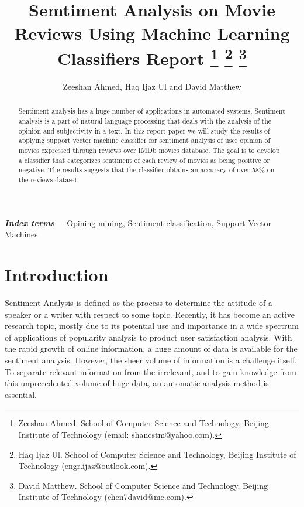 \documentclass[conference]{IEEEtran}
\providecommand{\keywords}[1]{\textbf{\textit{Index terms---}} #1}
\begin{document}
\title{\ \\ \LARGE\bf Semtiment Analysis on Movie Reviews Using Machine Learning Classifiers Report \thanks{Zeeshan Ahmed. 
School of Computer Science and Technology, Beijing Institute of Technology
(email: shancstm@yahoo.com).}
\thanks{Haq Ijaz Ul. 
School of Computer Science and Technology, Beijing Institute of Technology
(engr.ijaz@outlook.com).}
\thanks{David Matthew. 
School of Computer Science and Technology, Beijing Institute of Technology
(chen7david@me.com).}
}

\author{Zeeshan Ahmed, Haq Ijaz Ul and David Matthew}


\maketitle

\begin{abstract}

Sentiment analysis has a huge number of applications in automated systems. Sentiment analysis is a part of natural language processing that deals with the analysis of the opinion and subjectivity in a text. In this report paper we will study the results of applying support vector machine classifier for sentiment analysis of user opinion of movies expressed through reviews over IMDb movies database. The goal is to develop a classifier that categorizes sentiment of each review of movies as being positive or negative. The results suggests that the classifier obtains an accuracy of over 58\% on the reviews dataset.

\end{abstract}

\keywords{ Opining mining, Sentiment classification, Support Vector Machines }


\section{Introduction}

Sentiment Analysis is defined as the process to determine the attitude of a speaker or a writer with respect to some topic. Recently, it has become an active research topic, mostly due to its potential use and importance in a wide spectrum of applications of popularity analysis to product user satisfaction analysis. With the rapid growth of online information, a huge amount of data is available for the sentiment analysis. However, the sheer volume of information is a challenge itself. To separate relevant information from the irrelevant, and to gain knowledge from this unprecedented volume of huge data, an automatic analysis method is essential.
\end{document}

